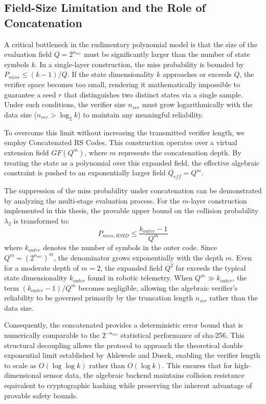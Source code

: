 \subsection{Field-Size Limitation and the Role of Concatenation}
\label{subsec:algebraic_limit}

A critical bottleneck in the rudimentary polynomial model is that the size of the evaluation field $Q = 2^{n_{ver}}$ must be significantly larger than the number of state symbols $k$. In a single-layer construction, the miss probability is bounded by $P_{miss} \le (k-1)/Q$. If the state dimensionality $k$ approaches or exceeds $Q$, the verifier space becomes too small, rendering it mathematically impossible to guarantee a seed $r$ that distinguishes two distinct states via a single sample. Under such conditions, the verifier size $n_{ver}$ must grow logarithmically with the data size ($n_{ver} > \log_2 k$) to maintain any meaningful reliability.

To overcome this limit without increasing the transmitted verifier length, we employ Concatenated RS Codes. This construction operates over a virtual extension field $GF(Q^{m})$, where $m$ represents the concatenation depth. By treating the state as a polynomial over this expanded field, the effective algebraic constraint is pushed to an exponentially larger field $Q_{eff} = Q^m$. 

The suppression of the miss probability under concatenation can be demonstrated by analyzing the multi-stage evaluation process. For the $m$-layer construction implemented in this thesis, the provable upper bound on the collision probability $\lambda_2$ is transformed to:
\begin{equation}
    P_{miss, RSID} \le \frac{k_{outer}-1}{Q^{m}}
\end{equation}
where $k_{outer}$ denotes the number of symbols in the outer code. Since $Q^m = (2^{n_{ver}})^m$, the denominator grows exponentially with the depth $m$. Even for a moderate depth of $m=2$, the expanded field $Q^2$ far exceeds the typical state dimensionality $k_{outer}$ found in robotic telemetry. When $Q^m \gg k_{outer}$, the term $(k_{outer}-1)/Q^m$ becomes negligible, allowing the algebraic verifier's reliability to be governed primarily by the truncation length $n_{ver}$ rather than the data size. 

Consequently, the concatenated  provides a deterministic error bound that is numerically comparable to the $2^{-n_{ver}}$ statistical performance of \gls{sha}-256. This structural decoupling allows the protocol to approach the theoretical double exponential limit established by Ahlswede and Dueck, enabling the verifier length to scale as $O(\log \log k)$ rather than $O(\log k)$. This ensures that for high-dimensional sensor data, the algebraic backend maintains collision resistance equivalent to cryptographic hashing while preserving the inherent advantage of provable safety bounds.

